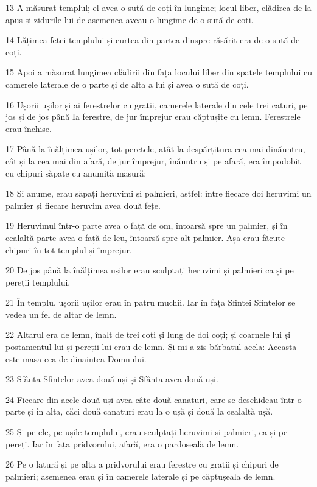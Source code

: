 \par 13 A măsurat templul; el avea o sută de coți în lungime; locul liber, clădirea de la apus și zidurile lui de asemenea aveau o lungime de o sută de coti.
\par 14 Lățimea feței templului și curtea din partea dinspre răsărit era de o sută de coți.
\par 15 Apoi a măsurat lungimea clădirii din fața locului liber din spatele templului cu camerele laterale de o parte și de alta a lui și avea o sută de coți.
\par 16 Ușorii ușilor și ai ferestrelor cu gratii, camerele laterale din cele trei caturi, pe jos și de jos până Ia ferestre, de jur împrejur erau căptușite cu lemn. Ferestrele erau închise.
\par 17 Până la înălțimea ușilor, tot peretele, atât la despărțitura cea mai dinăuntru, cât și la cea mai din afară, de jur împrejur, înăuntru și pe afară, era împodobit cu chipuri săpate cu anumită măsură;
\par 18 Și anume, erau săpați heruvimi și palmieri, astfel: între fiecare doi heruvimi un palmier și fiecare heruvim avea două fețe.
\par 19 Heruvimul într-o parte avea o față de om, întoarsă spre un palmier, și în cealaltă parte avea o față de leu, întoarsă spre alt palmier. Așa erau făcute chipuri în tot templul și împrejur.
\par 20 De jos până la înălțimea ușilor erau sculptați heruvimi și palmieri ca și pe pereții templului.
\par 21 În templu, ușorii ușilor erau în patru muchii. Iar în fața Sfintei Sfintelor se vedea un fel de altar de lemn.
\par 22 Altarul era de lemn, înalt de trei coți și lung de doi coți; și coarnele lui și postamentul lui și pereții lui erau de lemn. Și mi-a zis bărbatul acela: Aceasta este masa cea de dinaintea Domnului.
\par 23 Sfânta Sfintelor avea două uși și Sfânta avea două uși.
\par 24 Fiecare din acele două uși avea câte două canaturi, care se deschideau într-o parte și în alta, căci două canaturi erau la o ușă și două la cealaltă ușă.
\par 25 Și pe ele, pe ușile templului, erau sculptați heruvimi și palmieri, ca și pe pereți. Iar în fața pridvorului, afară, era o pardoseală de lemn.
\par 26 Pe o latură și pe alta a pridvorului erau ferestre cu gratii și chipuri de palmieri; asemenea erau și în camerele laterale și pe căptușeala de lemn.

